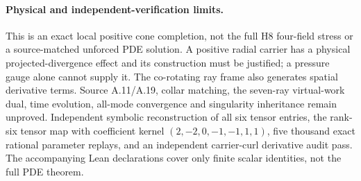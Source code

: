 \paragraph{Physical and independent-verification limits.}
This is an exact local positive cone completion, not the full
H8 four-field stress or a source-matched unforced PDE solution.
A positive radial carrier has a physical projected-divergence
effect and its construction must be justified; a pressure gauge
alone cannot supply it. The co-rotating ray frame also generates
spatial derivative terms. Source A.11/A.19, collar matching,
the seven-ray virtual-work dual, time evolution, all-mode
convergence and singularity inheritance remain unproved.
Independent symbolic reconstruction of all six tensor entries,
the rank-six tensor map with coefficient kernel
$(2,-2,0,-1,-1,1,1)$, five thousand exact rational parameter
replays, and an independent carrier-curl derivative audit pass.
The accompanying Lean declarations cover only finite scalar
identities, not the full PDE theorem.


